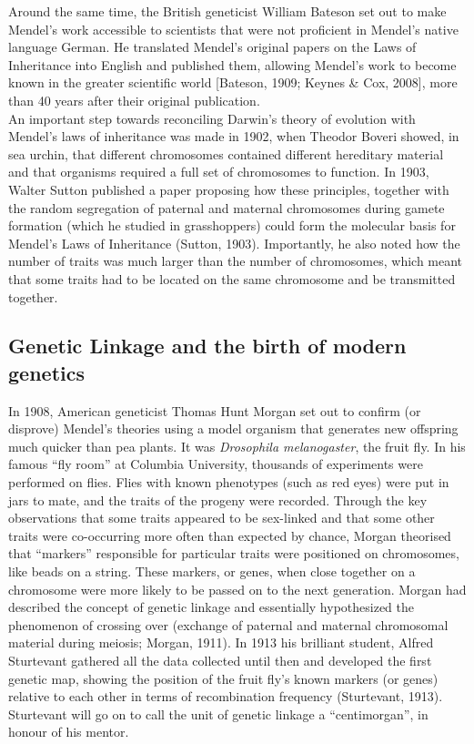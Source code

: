 Around the same time, the British geneticist William Bateson set out to make Mendel’s work accessible to scientists that were not proficient in Mendel’s native language German.
He translated Mendel’s original papers on the Laws of Inheritance into English and published them, allowing Mendel’s work to become known in the greater scientific world [Bateson, 1909; Keynes \& Cox, 2008], more than 40 years after their original publication.\\ 

An important step towards reconciling Darwin’s theory of evolution with Mendel’s laws of inheritance was made in 1902, when Theodor Boveri showed, in sea urchin, that different chromosomes contained different hereditary material and that organisms required a full set of chromosomes to function. 
In 1903, Walter Sutton published a paper proposing how these principles, together with the random segregation of paternal and maternal chromosomes during gamete formation (which he studied in grasshoppers) could form the molecular basis for Mendel’s Laws of Inheritance (Sutton, 1903). 
Importantly, he also noted how the number of traits was much larger than the number of chromosomes, which meant that some traits had to be located on the same chromosome and be transmitted together.\\

\subsection{Genetic Linkage and the birth of modern genetics} %

In 1908, American geneticist Thomas Hunt Morgan set out to confirm (or disprove) Mendel’s theories using a model organism that generates new offspring much quicker than pea plants. 
It was \textit{Drosophila melanogaster}, the fruit fly. 
In his famous “fly room” at Columbia University, thousands of experiments were performed on flies. 
Flies with known phenotypes (such as red eyes) were put in jars to mate, and the traits of the progeny were recorded. 
Through the key observations that some traits appeared to be sex-linked and that some other traits were co-occurring more often than expected by chance, Morgan theorised that “markers” responsible for particular traits were positioned on chromosomes, like beads on a string. 
These markers, or genes, when close together on a chromosome were more likely to be passed on to the next generation. 
Morgan had described the concept of genetic linkage and essentially hypothesized the phenomenon of crossing over (exchange of paternal and maternal chromosomal material during meiosis; Morgan, 1911). 
In 1913 his brilliant student, Alfred Sturtevant gathered all the data collected until then and developed the first genetic map, showing the position of the fruit fly’s known markers (or genes) relative to each other in terms of recombination frequency (Sturtevant, 1913). 
Sturtevant will go on to call the unit of genetic linkage a “centimorgan”, in honour of his mentor.\\

